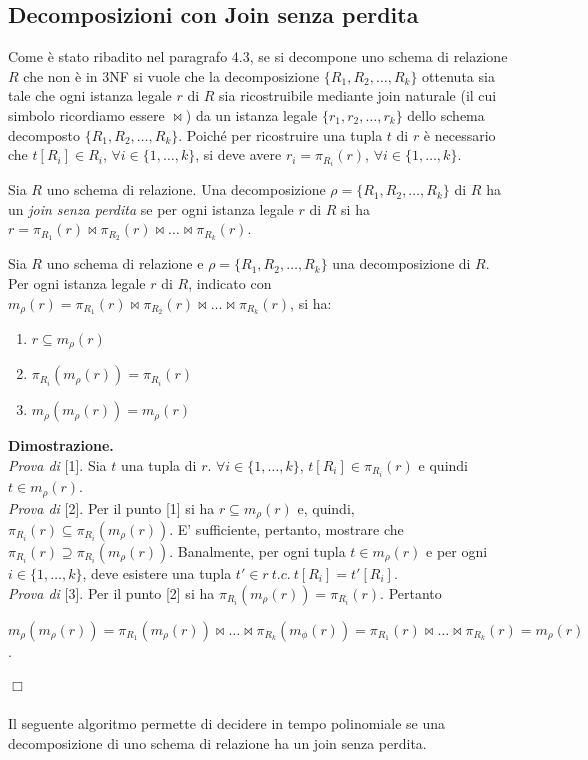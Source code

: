 \subsection{Decomposizioni con Join senza perdita}

Come è stato ribadito nel paragrafo 4.3, se si decompone uno schema di relazione $R$ che non è in 3NF si
vuole che la decomposizione $\{R_1, R_2, \ldots, R_k\}$ ottenuta sia tale che ogni istanza legale $r$
di $R$ sia ricostruibile mediante join naturale (il cui simbolo ricordiamo essere $\bowtie$) da un istanza 
legale $\{r_1, r_2, \ldots, r_k\}$ dello schema decomposto $\{R_1, R_2, \ldots, R_k\}$. Poiché per ricostruire
una tupla $t$ di $r$ è necessario che $t[R_i] \in R_i$, $\forall i \in \{1, \ldots, k\}$, si deve avere $r_i =
\pi_{R_i}(r)$, $\forall i \in \{1, \ldots, k\}$.
\begin{defn}
Sia $R$ uno schema di relazione. Una decomposizione $\rho = \{R_1, R_2, \ldots, R_k\}$ di $R$ ha un
\emph{join senza perdita} se per ogni istanza legale $r$ di $R$ si ha $r = \pi_{R_1}(r) \bowtie \pi_{R_2}(r) 
\bowtie \ldots \bowtie \pi_{R_k}(r)$.
\end{defn}
\begin{theo}
Sia $R$ uno schema di relazione e $\rho = \{R_1, R_2, \ldots, R_k\}$ una decomposizione di $R$. Per ogni
istanza legale $r$ di $R$, indicato con $m_{\rho}(r) =\pi_{R_1}(r) \bowtie \pi_{R_2}(r) 
\bowtie \ldots \bowtie \pi_{R_k}(r)$, si ha:
\begin{enumerate}
 \item $r\subseteq m_{\rho}(r)$
 \item $\pi_{R_i}(m_{\rho}(r)) = \pi_{R_i}(r)$
 \item $m_{\rho}(m_{\rho}(r)) = m_{\rho}(r)$
\end{enumerate}
\end{theo}
\textbf{Dimostrazione.}\\
\emph{Prova di }[1]. Sia $t$ una tupla di $r$. $\forall i \in \{1, \ldots, k\}$, $t[R_i] \in \pi_{R_i}(r)$ e
quindi $t \in m_{\rho}(r)$.\\
\emph{Prova di }[2]. Per il punto [1] si ha $r \subseteq m_{\rho}(r)$ e, quindi, $\pi_{R_i}(r) \subseteq 
\pi_{R_i}(m_{\rho}(r))$. E' sufficiente, pertanto, mostrare che $\pi_{R_i}(r) \supseteq \pi_{R_i}(m_{\rho}(r))$.
Banalmente, per ogni tupla $t \in m_\rho(r)$ e per ogni $i \in \{1, \ldots, k\}$, deve esistere una tupla
$t' \in r\ t.c.\ t[R_i] = t'[R_i]$.\\
\emph{Prova di }[3]. Per il punto [2] si ha $\pi_{R_i}(m_\rho(r)) = \pi_{R_i}(r)$. Pertanto
\begin{center}
$m_\rho(m_\rho(r)) = \pi_{R_1}(m_\rho(r)) \bowtie \ldots \bowtie \pi_{R_k}(m_\phi(r)) = \pi_{R_1}(r) \bowtie
\ldots \bowtie \pi_{R_k}(r) = m_\rho(r)$. 
\end{center}
\hfill $\Box$\\\\
Il seguente algoritmo permette di decidere in tempo polinomiale se una decomposizione di uno schema di relazione
ha un join senza perdita.


